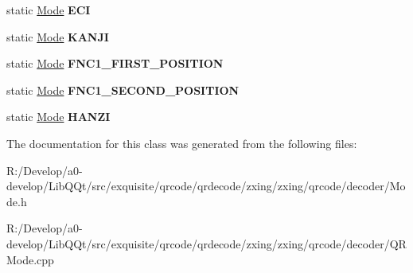 \begin{DoxyCompactItemize}
static \mbox{\hyperlink{classzxing_1_1qrcode_1_1_mode}{Mode}} {\bfseries E\+CI}
\item 
\mbox{\label{classzxing_1_1qrcode_1_1_mode_aee8ddd19fd206bf2cf5bfc93d7540ea6}} 
static \mbox{\hyperlink{classzxing_1_1qrcode_1_1_mode}{Mode}} {\bfseries K\+A\+N\+JI}
\item 
\mbox{\label{classzxing_1_1qrcode_1_1_mode_a7bedd8705cca360067f2f64c7596448e}} 
static \mbox{\hyperlink{classzxing_1_1qrcode_1_1_mode}{Mode}} {\bfseries F\+N\+C1\+\_\+\+F\+I\+R\+S\+T\+\_\+\+P\+O\+S\+I\+T\+I\+ON}
\item 
\mbox{\label{classzxing_1_1qrcode_1_1_mode_a1278d73e75254527ce4d1ebdd10ef028}} 
static \mbox{\hyperlink{classzxing_1_1qrcode_1_1_mode}{Mode}} {\bfseries F\+N\+C1\+\_\+\+S\+E\+C\+O\+N\+D\+\_\+\+P\+O\+S\+I\+T\+I\+ON}
\item 
\mbox{\label{classzxing_1_1qrcode_1_1_mode_aa34211e1b153c24b97f9a12b29be41ee}} 
static \mbox{\hyperlink{classzxing_1_1qrcode_1_1_mode}{Mode}} {\bfseries H\+A\+N\+ZI}
\end{DoxyCompactItemize}


The documentation for this class was generated from the following files\+:\begin{DoxyCompactItemize}
\item 
R\+:/\+Develop/a0-\/develop/\+Lib\+Q\+Qt/src/exquisite/qrcode/qrdecode/zxing/zxing/qrcode/decoder/Mode.\+h\item 
R\+:/\+Develop/a0-\/develop/\+Lib\+Q\+Qt/src/exquisite/qrcode/qrdecode/zxing/zxing/qrcode/decoder/Q\+R\+Mode.\+cpp\end{DoxyCompactItemize}
